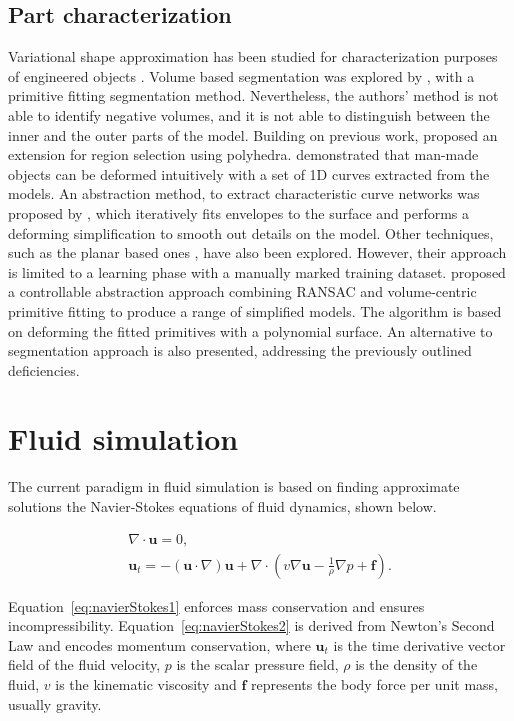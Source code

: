 \subsection{Part characterization}

Variational shape approximation has been studied for characterization purposes of engineered objects \cite{Cohen-Steiner2004}.
Volume based segmentation was explored by \cite{Attene2006}, with a primitive fitting segmentation method.
Nevertheless, the authors' method is not able to identify negative volumes, and it is not able to distinguish between the inner and the outer parts of the model.
Building on previous work, \cite{Attene2008} proposed an extension for region selection using polyhedra.
\cite{Gal2009} demonstrated that man-made objects can be deformed intuitively with a set of 1D curves extracted from the models.
An abstraction method, to extract characteristic curve networks was proposed by \cite{Mehra2009}, which iteratively fits envelopes to the surface and performs a deforming simplification to smooth out details on the model.
Other techniques, such as the planar based ones \cite{McCrae2011}, have also been explored.
However, their approach is limited to a learning phase with a manually marked training dataset.
\cite{Yumer2012} proposed a controllable abstraction approach combining RANSAC and volume-centric primitive fitting to produce a range of simplified models.
The algorithm is based on deforming the fitted primitives with a polynomial surface.
An alternative to \cite{Attene2006} segmentation approach is also presented, addressing the previously outlined deficiencies.

\section{Fluid simulation}
\label{prevWorkFluidSim}

The current paradigm in fluid simulation is based on finding approximate solutions the Navier-Stokes equations of fluid dynamics, shown below.

\begin{gather}
\label{eq:navierStokes1}
\nabla \cdot \mathbf{u} = 0,\\
\label{eq:navierStokes2}
\mathbf{u}_t = -(\mathbf{u} \cdot \nabla)\mathbf{u} + \nabla \cdot ( v \nabla \mathbf{u} - \frac{1}{\rho} \nabla p + \mathbf{f} ).
\end{gather}

Equation~\ref{eq:navierStokes1} enforces mass conservation and ensures incompressibility. Equation~\ref{eq:navierStokes2} is derived from Newton's Second Law and encodes momentum conservation, where $\mathbf{u}_t$ is the time derivative vector field of the fluid velocity, $p$  is the scalar pressure field, $\rho$ is the density of the fluid, $v$ is the kinematic viscosity and $\mathbf{f}$ represents the body force per unit mass, usually gravity.


